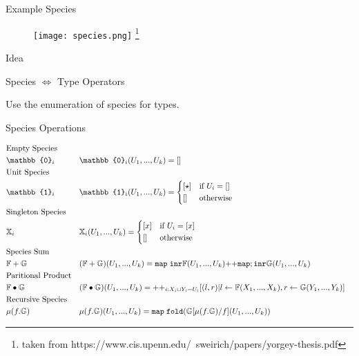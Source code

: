 \documentclass{beamer}
\newcommand{\irl}[1]{\mathtt{#1}}
\begin{document}
\begin{frame}[fragile]{Example Species}
\begin{figure}
  \texttt{[image: species.png]}
  \label{fig:boat1}
\footnote{taken from https://www.cis.upenn.edu/~sweirich/papers/yorgey-thesis.pdf}
\end{figure}
\end{frame}

\begin{frame}{Idea}
\begin{center}
Species $\iff$ Type Operators\\
\end{center}
Use the enumeration of species for types.
\end{frame}

\begin{frame}[fragile]{Species Operations}
\begin{scriptsize}
\begin{align*}
 &\text{Empty Species}\\
&\mathbb{0}_i &&\mathbb{0}_i(U_1,...,U_k) = [] \\
& \text{Unit Species}\\
&\mathbb{1}_i &&\mathbb{1}_i(U_1,...,U_k) =
		\begin{cases*}
      [\star] & if $U_i = []$\\
      []        & otherwise
    \end{cases*} \\
& \text{Singleton Species}\\
&\mathbb{X}_i && \mathbb{X}_i(U_1,...,U_k) = 
		\begin{cases*}
      [x] & if $U_i = [x]$\\
      []        & otherwise
    \end{cases*} \\
& \text{Species Sum}\\
&\mathbb{F} + \mathbb{G} && (\mathbb{F} + \mathbb{G})(U_1,...,U_k) = 
	\irl{map}\; \irl{inr} \mathbb{F}(U_1,...,U_k) {++} \irl{map};\irl{inr} \mathbb{G}(U_1,...,U_k)& \\
&\text{Paritional Product}\\
&\mathbb{F} \bullet \mathbb{G} && (\mathbb{F} \bullet \mathbb{G})(U_1,...,U_k) = 
	{++}_{i : X_i \sqcup Y_i = U_i}	
	[(l,r) | l \leftarrow \mathbb{F}(X_1,...,X_k), r \leftarrow \mathbb{G}(Y_1,...,Y_k)]& \\ 
&\text{Recursive Species}\\
&\mu(f.\mathbb{G}) && \mu(f.\mathbb{G})(U_1,...,U_k) = \irl{map}\; \irl{fold} (\mathbb{G}[\mu(f.\mathbb{G})/f](U_1,...,U_k))& \\
\end{align*}
\end{scriptsize}
\end{frame}
\end{document}
